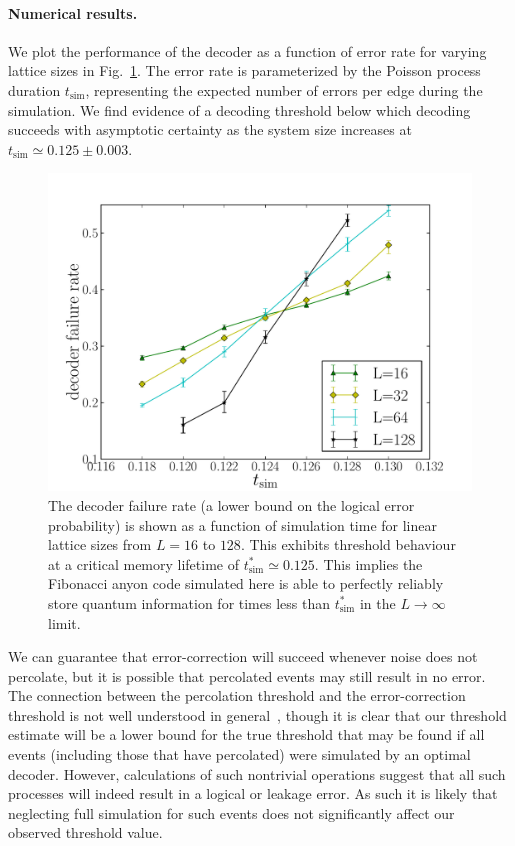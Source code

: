 \documentclass[aps, prl, letterpaper, twocolumn, superscriptaddress, notitlepage, 10pt]{revtex4-1}
\newcommand{\Fref}[1]{Fig.~\ref{#1}}
\begin{document}
\paragraph{Numerical results.}

We plot the performance of the decoder as a function of error rate for varying lattice sizes in 
\Fref{f:threshold}. 
The error rate is parameterized by the Poisson process duration $t_{\mathrm{sim}}$, representing the expected number of errors per edge during the simulation. 
We find evidence of a decoding threshold below which decoding succeeds with asymptotic 
certainty as the system size increases at $t_{\mathrm{sim}}\simeq 0.125 \pm 0.003$.

\begin{figure}[th!]
\begin{center}
	\includegraphics[width=\columnwidth]{anyons-kyle.pdf}
\caption{The decoder failure rate (a lower bound on the logical error probability) is shown as a function of simulation time for linear lattice sizes from $L=16$ to $128$. This exhibits threshold behaviour at a critical memory lifetime of $t_{\mathrm{sim}}^*\simeq 0.125$. This implies the Fibonacci anyon code simulated here is able to perfectly reliably store quantum information for times less than $t_{\mathrm{sim}}^*$ in the $L\to \infty$ limit.}
\label{f:threshold}
\end{center}
\end{figure}

We can guarantee that error-correction will succeed whenever noise does not percolate, but it is possible that percolated events may still result in no error. 
The connection between the percolation threshold and the error-correction threshold is not well understood in general~\cite{Hastings2014}, though it is clear that our threshold estimate will be a lower bound for the true threshold that may be found if all events (including those that have percolated) were simulated by an optimal decoder. 
However, calculations of such nontrivial operations suggest that all such processes will indeed result in a logical or leakage error.
As such it is likely that neglecting full simulation for such events does not significantly affect our observed threshold value.
\end{document}
